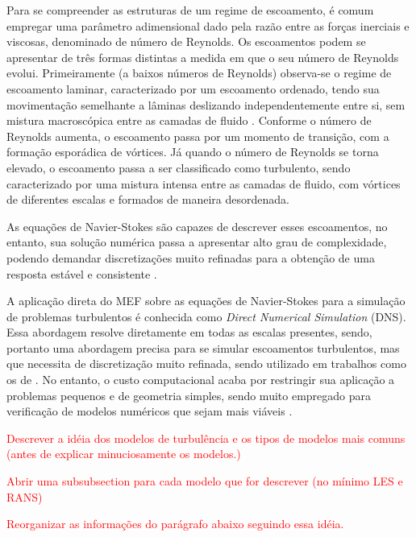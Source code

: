 Para se compreender as estruturas de um regime de escoamento, é comum empregar uma parâmetro adimensional dado pela razão entre as forças inerciais e viscosas, denominado de número de Reynolds. Os escoamentos podem se apresentar de três formas distintas a medida em que o seu número de Reynolds evolui. Primeiramente (a baixos números de Reynolds) observa-se o regime de escoamento laminar, caracterizado por um escoamento ordenado, tendo sua movimentação semelhante a lâminas deslizando independentemente entre si, sem mistura macroscópica entre as camadas de fluido \cite{popiolek2005analise,shaughnessy2005introduction}. Conforme o número de Reynolds aumenta, o escoamento passa por um momento de transição, com a formação esporádica de vórtices. Já quando o número de Reynolds se torna elevado, o escoamento passa a ser classificado como turbulento, sendo caracterizado por uma mistura intensa entre as camadas de fluido, com vórtices de diferentes escalas e formados de maneira desordenada.

As equações de Navier-Stokes são capazes de descrever esses escoamentos, no entanto, sua solução numérica passa a apresentar alto grau de complexidade, podendo demandar discretizações muito refinadas para a obtenção de uma resposta estável e consistente \cite{neto2002fundamentos}.

A aplicação direta do MEF sobre as equações de Navier-Stokes para a simulação de problemas turbulentos é conhecida como \textit{Direct Numerical Simulation} (DNS). Essa abordagem resolve diretamente em todas as escalas presentes, sendo, portanto uma abordagem precisa para se simular escoamentos turbulentos, mas que necessita de discretização muito refinada, sendo utilizado em trabalhos como os de . No entanto, o custo computacional acaba por restringir sua aplicação a problemas pequenos e de geometria simples, sendo muito empregado para verificação de modelos numéricos que sejam mais viáveis \cite{piomelli1999large,yokokawa200216}.


\textcolor{red}{Descrever a idéia dos modelos de turbulência e os tipos de modelos mais comuns (antes de explicar minuciosamente os modelos.)}

\textcolor{red}{Abrir uma subsubsection para cada modelo que for descrever (no mínimo LES e RANS)}

\textcolor{red}{Reorganizar as informações do parágrafo abaixo seguindo essa idéia.}

 \label{RANS}

